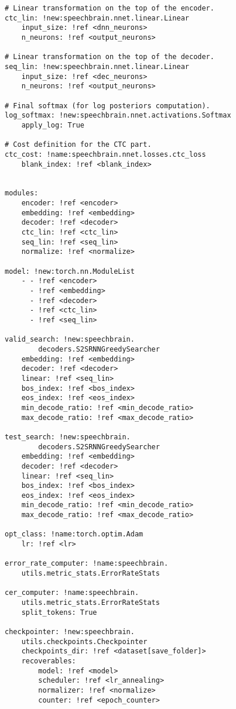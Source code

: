 \begin{verbatim}
# Linear transformation on the top of the encoder.
ctc_lin: !new:speechbrain.nnet.linear.Linear
    input_size: !ref <dnn_neurons>
    n_neurons: !ref <output_neurons>

# Linear transformation on the top of the decoder.
seq_lin: !new:speechbrain.nnet.linear.Linear
    input_size: !ref <dec_neurons>
    n_neurons: !ref <output_neurons>

# Final softmax (for log posteriors computation).
log_softmax: !new:speechbrain.nnet.activations.Softmax
    apply_log: True

# Cost definition for the CTC part.
ctc_cost: !name:speechbrain.nnet.losses.ctc_loss
    blank_index: !ref <blank_index>


modules:
    encoder: !ref <encoder>
    embedding: !ref <embedding>
    decoder: !ref <decoder>
    ctc_lin: !ref <ctc_lin>
    seq_lin: !ref <seq_lin>
    normalize: !ref <normalize>

model: !new:torch.nn.ModuleList
    - - !ref <encoder>
      - !ref <embedding>
      - !ref <decoder>
      - !ref <ctc_lin>
      - !ref <seq_lin>

valid_search: !new:speechbrain.
        decoders.S2SRNNGreedySearcher
    embedding: !ref <embedding>
    decoder: !ref <decoder>
    linear: !ref <seq_lin>
    bos_index: !ref <bos_index>
    eos_index: !ref <eos_index>
    min_decode_ratio: !ref <min_decode_ratio>
    max_decode_ratio: !ref <max_decode_ratio>

test_search: !new:speechbrain.
        decoders.S2SRNNGreedySearcher
    embedding: !ref <embedding>
    decoder: !ref <decoder>
    linear: !ref <seq_lin>
    bos_index: !ref <bos_index>
    eos_index: !ref <eos_index>
    min_decode_ratio: !ref <min_decode_ratio>
    max_decode_ratio: !ref <max_decode_ratio>

opt_class: !name:torch.optim.Adam
    lr: !ref <lr>

error_rate_computer: !name:speechbrain.
    utils.metric_stats.ErrorRateStats

cer_computer: !name:speechbrain.
    utils.metric_stats.ErrorRateStats
    split_tokens: True

checkpointer: !new:speechbrain.
    utils.checkpoints.Checkpointer
    checkpoints_dir: !ref <dataset[save_folder]>
    recoverables:
        model: !ref <model>
        scheduler: !ref <lr_annealing>
        normalizer: !ref <normalize>
        counter: !ref <epoch_counter>
\end{verbatim}


